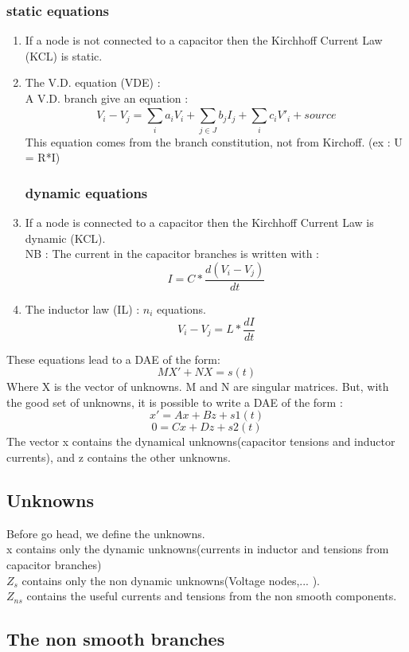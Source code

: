 \subsubsection{static equations}
\begin{enumerate}
  \item If a node is not connected to a capacitor then the Kirchhoff Current Law (KCL) is static. \\
  \item The V.D. equation (VDE) : \\
    A V.D. branch give an equation :
    \[V_{i}-V_{j} = \sum_{i}^{}a_{i}V_{i} + \sum_{j\in J}^{}b_{j}I_{j} +  \sum_{i}^{}c_{i}V'_{i} +
    source\]
    This equation comes from the branch constitution, not from Kirchoff. (ex : U = R*I)
\subsubsection{dynamic equations}
  \item If a node is connected to a capacitor then the Kirchhoff Current Law is dynamic (KCL).\\
    NB : The current in the capacitor branches is written with :
    \[I = C*\frac{d(V_{i} - V_{j})}{dt}\]
  \item The inductor law (IL) : $n_{i}$ equations.
     \[V_{i} - V_{j} = L*\frac{dI}{dt}\]
\end{enumerate}

These equations lead to a DAE of the form:
\[MX'+NX=s(t)\]
Where X is the vector of unknowns. M and N are singular matrices. But, with the good set of
unknowns, it is possible to write a DAE of the form :
\[x' = Ax+Bz+s1(t)\]
\[0  = Cx+Dz+s2(t)\]
The vector x contains the dynamical unknowns(capacitor tensions and inductor currents), and z
contains the other unknowns.
\subsection{Unknowns}
Before go head, we define the unknowns.\\
x contains only the dynamic unknowns(currents in inductor and tensions from capacitor branches)\\
$Z_{s}$ contains only the non dynamic unknowns(Voltage nodes,... ).\\
$Z_{ns}$ contains the useful currents and tensions from the non smooth components.\\


\subsection{The non smooth branches}
